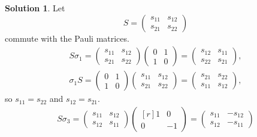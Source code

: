 \documentclass[11pt, a4paper]{report}
\theoremstyle{definition}
\newtheorem{sol}{Solution}[part]
\begin{document}
\begin{sol}

Let
\[
    S = \begin{pmatrix}
            s_{11} & s_{12} \\
            s_{21} & s_{22}
        \end{pmatrix}
\]
commute with the Pauli matrices.
\begin{gather*}
    S \sigma_1 =
        \begin{pmatrix}
            s_{11} & s_{12} \\
            s_{21} & s_{22}
        \end{pmatrix}
        \begin{pmatrix}
            0 & 1 \\
            1 & 0
        \end{pmatrix}
        =
        \begin{pmatrix}
            s_{12} & s_{11} \\
            s_{22} & s_{21}
        \end{pmatrix}, \\
    \sigma_1 S =
        \begin{pmatrix}
            0 & 1 \\
            1 & 0
        \end{pmatrix}
        \begin{pmatrix}
            s_{11} & s_{12} \\
            s_{21} & s_{22}
        \end{pmatrix}
        =
        \begin{pmatrix}
            s_{21} & s_{22} \\
            s_{11} & s_{12}
        \end{pmatrix},
\end{gather*}
so $s_{11} = s_{22}$ and $s_{12} = s_{21}$.
\begin{gather*}
    S \sigma_3 =
        \begin{pmatrix}
            s_{11} & s_{12} \\
            s_{12} & s_{11}
        \end{pmatrix}
        \begin{pmatrix*}[r]
            1 &  0 \\
            0 & -1
        \end{pmatrix*}
        =
        \begin{pmatrix}
            s_{11} & -s_{12} \\
            s_{12} & -s_{11}

\end{pmatrix}
\end{gather*}
\end{sol}
\end{document}
